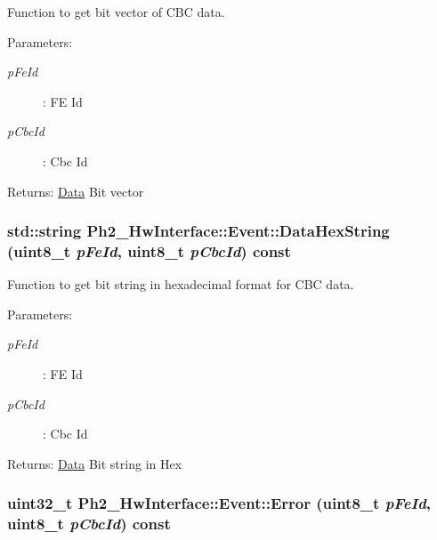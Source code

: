 Function to get bit vector of CBC data. 

\begin{Desc}
\item[Parameters:]
\begin{description}
\item[{\em p\-Fe\-Id}]: FE Id \item[{\em p\-Cbc\-Id}]: Cbc Id \end{description}
\end{Desc}
\begin{Desc}
\item[Returns:]\hyperlink{class_ph2___hw_interface_1_1_data}{Data} Bit vector \end{Desc}
\hypertarget{class_ph2___hw_interface_1_1_event_b7a41db929dba07f724a0b0f3e5ba626}{
\subsubsection[DataHexString]{\setlength{\rightskip}{0pt plus 5cm}std::string Ph2\_\-Hw\-Interface::Event::Data\-Hex\-String (uint8\_\-t {\em p\-Fe\-Id}, uint8\_\-t {\em p\-Cbc\-Id}) const}}
\label{class_ph2___hw_interface_1_1_event_b7a41db929dba07f724a0b0f3e5ba626}


Function to get bit string in hexadecimal format for CBC data. 

\begin{Desc}
\item[Parameters:]
\begin{description}
\item[{\em p\-Fe\-Id}]: FE Id \item[{\em p\-Cbc\-Id}]: Cbc Id \end{description}
\end{Desc}
\begin{Desc}
\item[Returns:]\hyperlink{class_ph2___hw_interface_1_1_data}{Data} Bit string in Hex \end{Desc}
\hypertarget{class_ph2___hw_interface_1_1_event_b3bbc58be7f96ba0dbc1721eb90d4380}{
\subsubsection[Error]{\setlength{\rightskip}{0pt plus 5cm}uint32\_\-t Ph2\_\-Hw\-Interface::Event::Error (uint8\_\-t {\em p\-Fe\-Id}, uint8\_\-t {\em p\-Cbc\-Id}) const}}
\label{class_ph2___hw_interface_1_1_event_b3bbc58be7f96ba0dbc1721eb90d4380}


